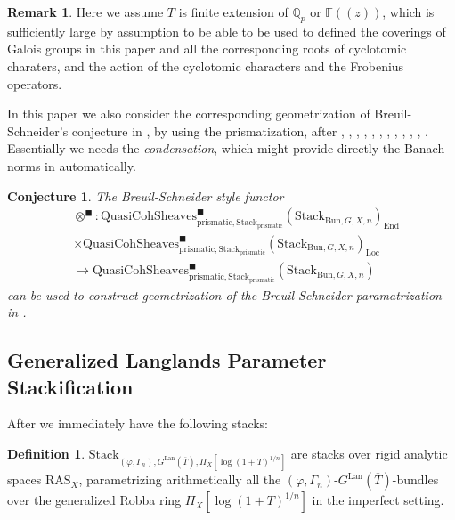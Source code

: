 \documentclass[12pt]{article}
\newtheorem{conjecture}{Conjecture}
\theoremstyle{definition}
\newtheorem{definition}{Definition}
\newtheorem{remark}{Remark}
\begin{document}
\begin{remark}
Here we assume $T$ is finite extension of $\mathbb{Q}_p$ or $\mathbb{F}((z))$, which is sufficiently large by assumption to be able to be used to defined the coverings of Galois groups in this paper and all the corresponding roots of cyclotomic charaters, and the action of the cyclotomic characters and the Frobenius operators.
\end{remark}

\indent In this paper we also consider the corresponding geometrization of Breuil-Schneider's conjecture in \cite{BS}, by using the prismatization, after \cite{CSA}, \cite{CSB}, \cite{CSC}, \cite{SchD}, \cite{SALBRC}, \cite{TA}, \cite{TB}, \cite{TC}, \cite{BBBK}, \cite{BS2}, \cite{BLA}, \cite{DC}. Essentially we needs the \textit{condensation}, which might provide directly the Banach norms in \cite{BS} automatically.

\begin{conjecture}
The Breuil-Schneider style functor 
\begin{align}
&\otimes^\blacksquare: \mathrm{QuasiCohSheaves}^\blacksquare_{\mathrm{prismatic},\mathrm{Stack}_{\mathrm{prismatic}}}(\mathrm{Stack}_{\mathrm{Bun},G,X,n})_{\mathrm{End}}\\
&\times \mathrm{QuasiCohSheaves}^\blacksquare_{\mathrm{prismatic},\mathrm{Stack}_{\mathrm{prismatic}}}(\mathrm{Stack}_{\mathrm{Bun},G,X,n})_{\mathrm{Loc}}\\
& \rightarrow \mathrm{QuasiCohSheaves}^\blacksquare_{\mathrm{prismatic},\mathrm{Stack}_{\mathrm{prismatic}}}(\mathrm{Stack}_{\mathrm{Bun},G,X,n})
\end{align}
can be used to construct geometrization of the Breuil-Schneider paramatrization in \cite{BS}.
\end{conjecture}

\subsection{Generalized Langlands Parameter Stackification}

\indent After \cite{EGH} we immediately have the following stacks:

\begin{definition}
$\mathrm{Stack}_{(\varphi,\Gamma_n), G^\mathrm{Lan}(\overline{T}),\Pi_X[\log(1+T)^{1/n}]}$ are stacks over rigid analytic spaces $\mathrm{RAS}_X$, parametrizing arithmetically all the $(\varphi,\Gamma_n)$-$G^\mathrm{Lan}(\overline{T})$-bundles over the generalized Robba ring $\Pi_X[\log(1+T)^{1/n}]$ in the imperfect setting.
\end{definition}
\end{document}
